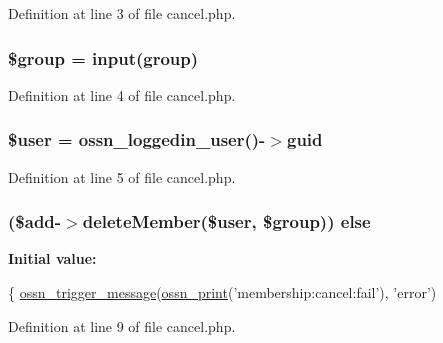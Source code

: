 Definition at line 3 of file cancel.\+php.

\subsubsection[{\texorpdfstring{\$group}{$group}}]{\setlength{\rightskip}{0pt plus 5cm}\$group = {\bf input}(\textquotesingle{}group\textquotesingle{})}\hypertarget{cancel_8php_ad530a85733b0ec1dc321859fd8faa0dc}{}\label{cancel_8php_ad530a85733b0ec1dc321859fd8faa0dc}


Definition at line 4 of file cancel.\+php.

\subsubsection[{\texorpdfstring{\$user}{$user}}]{\setlength{\rightskip}{0pt plus 5cm}\${\bf user} = {\bf ossn\+\_\+loggedin\+\_\+user}()-\/$>$guid}\hypertarget{cancel_8php_a598ca4e71b15a1313ec95f0df1027ca5}{}\label{cancel_8php_a598ca4e71b15a1313ec95f0df1027ca5}


Definition at line 5 of file cancel.\+php.

\subsubsection[{\texorpdfstring{else}{else}}]{ (\${\bf add}-\/$>$delete\+Member(\${\bf user}, \$group)) else}\hypertarget{cancel_8php_a30a70331ae01e6479af6dec9eacf61bf}{}\label{cancel_8php_a30a70331ae01e6479af6dec9eacf61bf}
{\bfseries Initial value\+:}
\begin{DoxyCode}
\{
    \hyperlink{ossn_8lib_8system_8php_ab3f23f23f32f50c12e7aea0ffaccaac7}{ossn\_trigger\_message}(\hyperlink{ossn_8lib_8languages_8php_a2be5d1c4b695593a9b9067b96df2150a}{ossn\_print}(\textcolor{stringliteral}{'membership:cancel:fail'}), \textcolor{stringliteral}{'error'})
\end{DoxyCode}


Definition at line 9 of file cancel.\+php.

